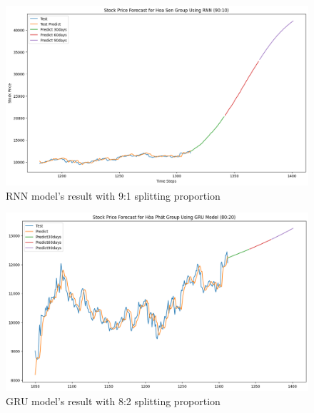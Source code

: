 \documentclass{ieeeojies}
\begin{document}
\begin{figure}[H]
  \centering
  \begin{minipage}{0.8\linewidth}
    \centering
    \includegraphics[width=\linewidth]{bibliography/RNN_HPG.png}
    \caption{RNN model's result with 9:1 splitting proportion}
    \label{fig12}
  \end{minipage}
\end{figure}
\begin{figure}[H]
  \centering
  \begin{minipage}{0.8\linewidth}
    \centering
    \includegraphics[width=\linewidth]{bibliography/GRU_HPG_80-20.png}
    \caption{GRU model's result with 8:2 splitting proportion}
    \label{fig13}
  \end{minipage}
\end{figure}
\end{document}
